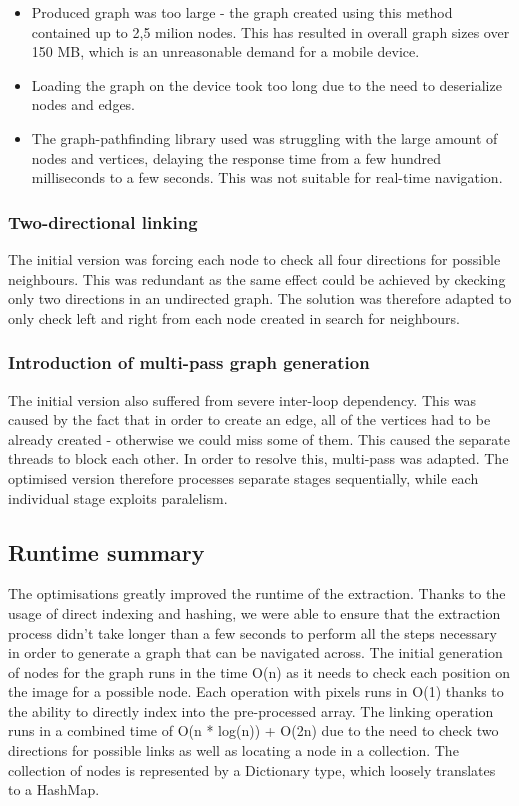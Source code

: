 \documentclass[main.tex]{subfiles}
\begin{document}
\begin{itemize}

\item Produced graph was too large - the graph created using this method contained up to 2,5 milion nodes. This has resulted in overall graph sizes over 150 MB, which is an unreasonable demand for a mobile device.

\item Loading the graph on the device took too long due to the need to deserialize nodes and edges.

\item The graph-pathfinding library used was struggling with the large amount of nodes and vertices, delaying the response time from a few hundred milliseconds to a few seconds. This was not suitable for real-time navigation.

\end{itemize}
	

\subsubsection{Two-directional linking}
	
The initial version was forcing each node to check all four directions for possible neighbours. This was redundant as the same effect could be achieved by ckecking only two directions in an undirected graph. The solution was therefore adapted to only check left and right from each node created in search for neighbours.

\subsubsection{Introduction of multi-pass graph generation}
The initial version also suffered from severe inter-loop dependency. This was caused by the fact that in order to create an edge, all of the vertices had to be already created - otherwise we could miss some of them. This caused the separate threads to block each other. In order to resolve this, multi-pass was adapted.  The optimised version therefore processes separate stages sequentially, while each individual stage exploits paralelism.

\subsection{Runtime summary}
The optimisations greatly improved the runtime of the extraction. Thanks to the usage of direct indexing and hashing, we were able to ensure that the extraction process didn't take longer than a few seconds to perform all the steps necessary in order to generate a graph that can be navigated across. The initial generation of nodes for the graph runs in the time O(n) as it needs to check each position on the image for a possible node. Each operation with pixels runs in O(1) thanks to the ability to directly index into the pre-processed array. The linking operation runs in a combined time of O(n * log(n)) + O(2n) due to the need to check two directions for possible links as well as locating a node in a collection. The collection of nodes is represented by a Dictionary type, which loosely translates to a HashMap. 
\end{document}
